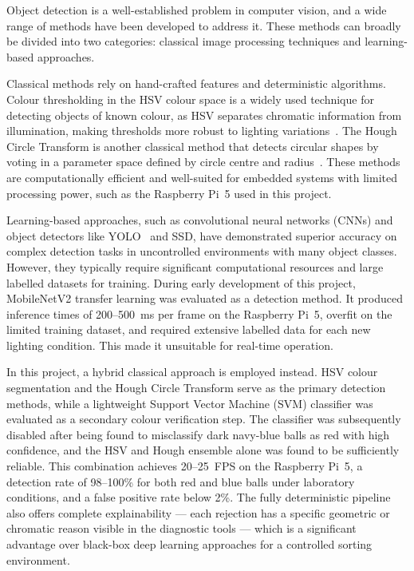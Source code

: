 
Object detection is a well-established problem in computer vision, and a wide range of
methods have been developed to address it. These methods can broadly be divided into two
categories: classical image processing techniques and learning-based approaches.

Classical methods rely on hand-crafted features and deterministic algorithms. Colour
thresholding in the HSV colour space is a widely used technique for detecting objects of known
colour, as HSV separates chromatic information from illumination, making thresholds more
robust to lighting variations~\cite{bradski2008learning}. The Hough Circle Transform is
another classical method that detects circular shapes by voting in a parameter space defined
by circle centre and radius~\cite{hough1962method}. These methods are computationally
efficient and well-suited for embedded systems with limited processing power, such as the
Raspberry Pi~5 used in this project.

Learning-based approaches, such as convolutional neural networks (CNNs) and object
detectors like YOLO~\cite{redmon2016yolo} and SSD, have demonstrated superior accuracy on
complex detection tasks in uncontrolled environments with many object classes. However, they
typically require significant computational resources and large labelled datasets for training.
During early development of this project, MobileNetV2 transfer learning was evaluated as a
detection method. It produced inference times of 200--500~ms per frame on the Raspberry
Pi~5, overfit on the limited training dataset, and required extensive labelled data for each
new lighting condition. This made it unsuitable for real-time operation.

In this project, a hybrid classical approach is employed instead. HSV colour segmentation
and the Hough Circle Transform serve as the primary detection methods, while a lightweight
Support Vector Machine (SVM) classifier was evaluated as a secondary colour verification
step. The classifier was subsequently disabled after being found to misclassify dark
navy-blue balls as red with high confidence, and the HSV and Hough ensemble alone was
found to be sufficiently reliable. This combination achieves 20--25~FPS on the Raspberry
Pi~5, a detection rate of 98--100\% for both red and blue balls under laboratory conditions,
and a false positive rate below 2\%. The fully deterministic pipeline also offers complete
explainability --- each rejection has a specific geometric or chromatic reason visible in the
diagnostic tools --- which is a significant advantage over black-box deep learning approaches
for a controlled sorting environment.